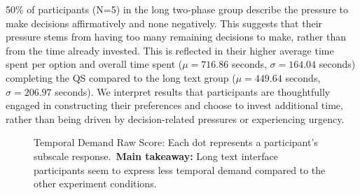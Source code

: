50\% of participants (N=5) in the long two-phase group describe the pressure to make decisions affirmatively and none negatively. This suggests that their pressure stems from having too many remaining decisions to make, rather than from the time already invested. This is reflected in their higher average time spent per option and overall time spent ($\mu=716.86$ seconds, $\sigma=164.04$ seconds) completing the QS compared to the long text group ($\mu=449.64$ seconds, $\sigma=206.97$ seconds). We interpret results that participants are thoughtfully engaged in constructing their preferences and choose to invest additional time, rather than being driven by decision-related pressures or experiencing urgency.

\begin{figure} %
    \centering
    \captionsetup{width=0.97\linewidth, justification=justified}
    \caption{Temporal Demand Raw Score: Each dot represents a participant's subscale response.~\textbf{Main takeaway: } Long text interface participants seem to express less temporal demand compared to the other experiment conditions.}
    \label{fig:temporal_cog_score}
\end{figure}

